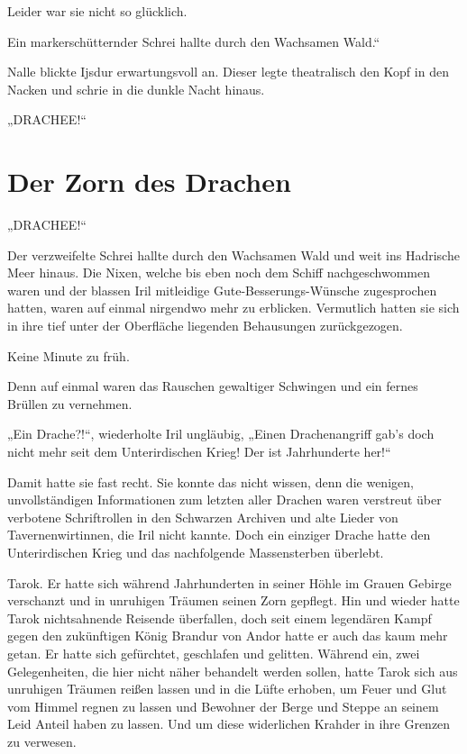 Leider war sie nicht so glücklich.

Ein markerschütternder Schrei hallte durch den Wachsamen Wald.“

Nalle blickte Ijsdur erwartungsvoll an. Dieser legte theatralisch den Kopf in den Nacken und schrie in die dunkle Nacht hinaus.

„DRACHEE!“



\newpage
\section{Der Zorn des Drachen}



„DRACHEE!“

Der verzweifelte Schrei hallte durch den Wachsamen Wald und weit ins Hadrische Meer hinaus. Die Nixen, welche bis eben noch dem Schiff nachgeschwommen waren und der blassen Iril mitleidige Gute-Besserungs-Wünsche zugesprochen hatten, waren auf einmal nirgendwo mehr zu erblicken. Vermutlich hatten sie sich in ihre tief unter der Oberfläche liegenden Behausungen zurückgezogen.

Keine Minute zu früh.

Denn auf einmal waren das Rauschen gewaltiger Schwingen und ein fernes Brüllen zu vernehmen.

„Ein Drache?!“, wiederholte Iril ungläubig, „Einen Drachenangriff gab’s doch nicht mehr seit dem Unterirdischen Krieg! Der ist Jahrhunderte her!“

Damit hatte sie fast recht. Sie konnte das nicht wissen, denn die wenigen, unvollständigen Informationen zum letzten aller Drachen waren verstreut über verbotene Schriftrollen in den Schwarzen Archiven und alte Lieder von Tavernenwirtinnen, die Iril nicht kannte. Doch ein einziger Drache hatte den Unterirdischen Krieg und das nachfolgende Massensterben überlebt.

Tarok. Er hatte sich während Jahrhunderten in seiner Höhle im Grauen Gebirge verschanzt und in unruhigen Träumen seinen Zorn gepflegt. Hin und wieder hatte Tarok nichtsahnende Reisende überfallen, doch seit einem legendären Kampf gegen den zukünftigen König Brandur von Andor hatte er auch das kaum mehr getan. Er hatte sich gefürchtet, geschlafen und gelitten. Während ein, zwei Gelegenheiten, die hier nicht näher behandelt werden sollen, hatte Tarok sich aus unruhigen Träumen reißen lassen und in die Lüfte erhoben, um Feuer und Glut vom Himmel regnen zu lassen und Bewohner der Berge und Steppe an seinem Leid Anteil haben zu lassen. Und um diese widerlichen Krahder in ihre Grenzen zu verwesen.

